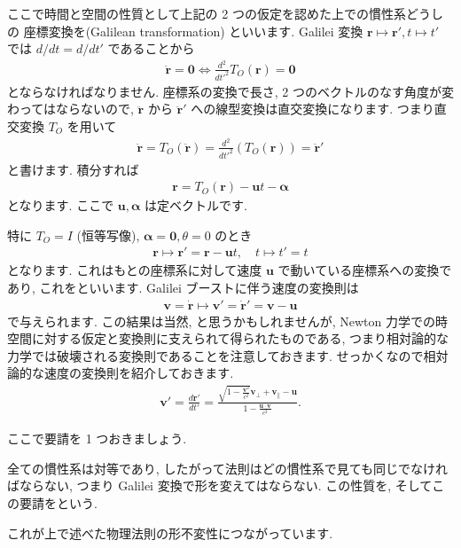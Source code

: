 \documentclass[openany, a4paper, oneside]{jsbook}
\begin{document}
ここで時間と空間の性質として上記の 2 つの仮定を認めた上での慣性系どうしの
座標変換を(Galilean transformation) といいます.
Galilei 変換 $\bm{r} \mapsto \bm{r}' , t \mapsto t'$ では
$d/dt = d/dt'$ であることから
\begin{gather}
    \ddot{ \bm{r} }
    =
    \bm{0}
    \Longleftrightarrow
    \frac{d^2} {dt'^2} T_O ( \bm{r} )
    =
    \bm{0}
\end{gather}
とならなければなりません.
座標系の変換で長さ, 2 つのベクトルのなす角度が変わってはならないので,
 $\ddot{ \bm{r} }$ から $\ddot{ \bm{r} }'$ への線型変換は直交変換になります.
つまり直交変換 $T_O$ を用いて
\begin{gather}
    \ddot{ \bm{r} }
    =
    T_O \left ( \ddot { \bm{r} } \right)
    =
    \frac{d^2} {dt'^2} \left ( T_O ( \bm{r} )  \right)
    =
    \ddot{ \bm{r} }'
\end{gather}
と書けます.
積分すれば
\begin{gather}
    \bm{r}
    =
    T_O \left ( \bm{r} \right) - \bm{u} t - \bm{ \alpha }
\end{gather}
となります. ここで $\bm{u} , \bm{ \alpha }$ は定ベクトルです.

特に $T_O = I$ (恒等写像), $\bm{\alpha} = \bm{0} , \theta = 0$ のとき
\begin{gather}
    \bm{r}
    \mapsto
    \bm{r}'
    =
    \bm{r} - \bm{u} t
    , \quad
    t
    \mapsto
    t'
    =
    t
\end{gather}
となります.
これはもとの座標系に対して速度 $\bm{u}$ で動いている座標系への変換であり,
これをといいます.
Galilei ブーストに伴う速度の変換則は
\begin{gather}
    \bm{v}
    =
    \dot { \bm{r} }
    \mapsto
    \bm{v}'
    =
    \dot{ \bm{r} }'
    =
    \bm{v} - \bm{u}
\end{gather}
で与えられます.
この結果は当然, と思うかもしれませんが,
Newton 力学での時空間に対する仮定と変換則に支えられて得られたものである,
つまり相対論的な力学では破壊される変換則であることを注意しておきます.
せっかくなので相対論的な速度の変換則を紹介しておきます.
\begin{gather}
    \bm{v}'
    =
    \frac{d \bm{r}'} {dt'}
    =
    \frac{ \sqrt{ 1- \frac{ \bm{v}^2 }{ c^2 } } \bm{v}_{\perp} + \bm{v}_{\|} - \bm{u}   }
        { 1 - \frac{ \bm{u} \cdot \bm{v} } { c^2 }  } .
\end{gather}

ここで要請を 1 つおきましょう.
\begin{req}
全ての慣性系は対等であり, したがって法則はどの慣性系で見ても同じでなければならない,
つまり Galilei 変換で形を変えてはならない.
この性質を,
そしてこの要請をという.
\end{req}
これが上で述べた物理法則の形不変性につながっています.
\end{document}
